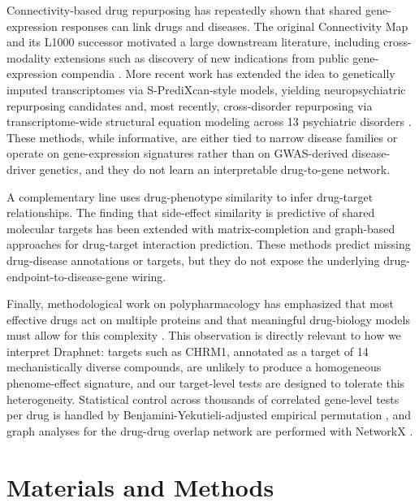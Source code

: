 \documentclass[11pt]{article}
\begin{document}
Connectivity-based drug repurposing has repeatedly shown that shared
gene-expression responses can link drugs and diseases. The original
Connectivity Map \citep{lamb2006cmap} and its L1000 successor
\citep{subramanian2017lincs} motivated a large downstream literature,
including cross-modality extensions such as discovery of new indications
from public gene-expression compendia \citep{sirota2011drugrepo}. More
recent work has extended the idea to genetically imputed transcriptomes
via S-PrediXcan-style models, yielding neuropsychiatric repurposing
candidates \citep{so2017neuropsychiatric,reay2020pes} and, most
recently, cross-disorder repurposing via transcriptome-wide structural
equation modeling across 13 psychiatric disorders
\citep{grotzinger2023tsem}. These methods, while informative, are
either tied to narrow disease families or operate on gene-expression
signatures rather than on GWAS-derived disease-driver genetics, and
they do not learn an interpretable drug-to-gene network.

A complementary line uses drug-phenotype similarity to infer drug-target
relationships. The finding that side-effect similarity is predictive of
shared molecular targets \citep{campillos2008sideeffect} has been
extended with matrix-completion and graph-based approaches for
drug-target interaction prediction. These methods predict missing
drug-disease annotations or targets, but they do not expose the
underlying drug-endpoint-to-disease-gene wiring.

Finally, methodological work on polypharmacology has emphasized that
most effective drugs act on multiple proteins and that meaningful
drug-biology models must allow for this complexity
\citep{hopkins2008network}. This observation is directly relevant to how
we interpret Draphnet: targets such as CHRM1, annotated as a target of
14 mechanistically diverse compounds, are unlikely to produce a
homogeneous phenome-effect signature, and our target-level tests are
designed to tolerate this heterogeneity. Statistical control across
thousands of correlated gene-level tests per drug is handled by
Benjamini-Yekutieli-adjusted empirical permutation
\citep{benjamini2001fdrdependency,benjamini1995fdr}, and graph
analyses for the drug-drug overlap network are performed with NetworkX
\citep{hagberg2008networkx}.

\section{Materials and Methods}
\end{document}
